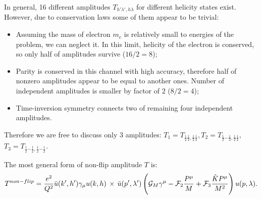 \documentclass{article}
\newcommand{\hp}{{\frac{1}{2}}}
\newcommand{\hm}{{-\frac{1}{2}}}
\newcommand{\cG}{{\cal G}}
\newcommand{\cF}{{\cal F}}
\begin{document}
	In general, 16 different amplitudes $T_{h'\lambda',h\lambda}$ 
	for different helicity states exist. However, due to conservation 
	laws some of them appear to be trivial:
	\begin{itemize}
		\item Assuming the mass of electron $m_e$ is relatively small 
			to energies of the problem, we can neglect it. In this 
			limit, helicity of the electron is conserved, so only half 
			of amplitudes survive ($16/2 = 8$);
		\item Parity is conserved in this channel with high accuracy, 
			therefore half of nonzero amplitudes appear to be equal 
			to another ones. Number of independent amplitudes is 
			smaller by factor of $2$ ($8/2 = 4$);
		\item Time-inversion symmetry connects two of remaining four 
			independent amplitudes.			
	\end{itemize}
	Therefore we are free to discuss only $3$ amplitudes: 
	$T_{1} = T_{\hp \hp, \hp \hp}, T_{2} = T_{\hp \hm, \hp \hp},$
	$T_{3} = T_{\hp \hm, \hp \hm}$.
	
	The most general form of non-flip amplitude $T$ is:
	\begin{equation} \label{str_amp} 
		T^{non-flip} = \frac{e^2}{Q^2} \bar{u}(k',h') \gamma_\mu u(k,h) 
		\, \times \, \bar{u}(p',\lambda') 
		\left(\cG_M  \gamma^\mu - \cF_2 
		\frac{P^{\mu}}{M} + \cF_3  \frac{\hat{K} P^{\mu}}{M^2} 
		\right) u(p,\lambda).
	\end{equation}
	
\end{document}
